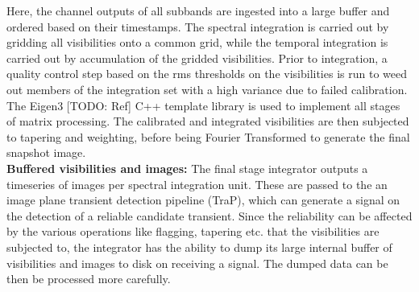 \documentclass{ws-jai}
\begin{document}
Here, the channel outputs  of all subbands are ingested into  a large buffer and
ordered based on  their timestamps.  The spectral integration is  carried out by
gridding all visibilities onto a common  grid, while the temporal integration is
carried out by accumulation of the gridded visibilities. Prior to integration, a
quality control step based  on the rms thresholds on the  visibilities is run to
weed out  members of  the integration  set with  a high  variance due  to failed
calibration.  The Eigen3  [TODO: Ref] C++ template library is  used to implement
all stages of matrix processing.  The calibrated and integrated visibilities are
then subjected  to tapering and  weighting, before being Fourier  Transformed to
generate the final snapshot image.\\

\noindent \textbf {Buffered visibilities and images:} The final stage integrator outputs a
timeseries of images  per spectral integration unit. These are  passed to the an
image plane transient detection pipeline (TraP),  which can generate a signal on
the detection  of a reliable candidate  transient. Since the reliability  can be
affected  by the  various  operations  like flagging,  tapering  etc.  that  the
visibilities are subjected to, the integrator  has the ability to dump its large
internal buffer  of visibilities and images  to disk on receiving  a signal. The
dumped data can be then be processed more carefully.\\


\end{document}
